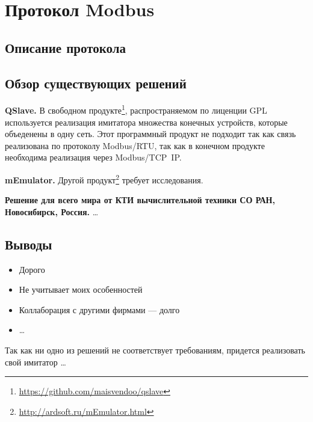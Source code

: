 \chapter{Протокол Modbus}\label{ch:ch2}



\section{Описание протокола}

\section{Обзор существующих решений}\label{sec:ch2/sec1}


\textbf{QSlave.}
В свободном продукте\footnote{\url{https://github.com/maisvendoo/qslave}}, распространяемом по лиценции GPL используется
реализация имитатора множества конечных устройств, которые объеденены в одну сеть.
Этот программный продукт не подходит так как связь реализована по протоколу
Modbus/RTU, так как в конечном продукте необходима реализация через Modbus/TCP~IP.

\textbf{mEmulator.}
Другой продукт\footnote{\url{http://ardsoft.ru/mEmulator.html}} требует исследования.


\textbf{Решение для всего мира от КТИ вычислительной техники СО РАН, Новосибирск, Россия.}
\cite{journal:vechisl_tech:2004_okolnischnikov} \ldots


\section*{Выводы}

\begin{itemize}
    \item Дорого
    \item Не учитывает моих особенностей
    \item Коллаборация с другими фирмами --- долго
    \item \ldots
\end{itemize}


Так как ни одно из решений не соответствует требованиям, придется реализовать свой
имитатор \ldots
